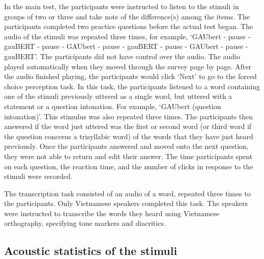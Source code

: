 \documentclass[a4paper]{article}
\begin{document}
In the main test, the participants were instructed to listen to the stimuli in groups of two or three and take note of the difference(s) among the items. The participants completed two practice questions before the actual test began. The audio of the stimuli was repeated three times, for example, `GAUbert - pause - gauBERT - pause - GAUbert - pause - gauBERT  - pause - GAUbert - pause - gauBERT'. The participants did not have control over the audio. The audio played automatically when they moved through the survey page by page. After the  audio finished playing, the participants would click `Next' to go to the forced choice perception task. In this task, the participants listened to a word containing one of the stimuli previously uttered as a single word, but uttered with a statement or a question intonation. For example, `GAUbert (question intonation)'. This stimulus was also repeated three times. The participants then answered if the word just uttered was the first or second word (or third word if the question concerns a trisyllabic word) of the words that they have just heard previously. Once the participants answered and moved onto the next question, they were not able to return and edit their answer. The time participants spent on each question, the reaction time, and the number of clicks in response to the stimuli were recorded.

The transcription task consisted of an audio of a word, repeated three times to the participants. Only Vietnamese speakers completed this task. The speakers were instructed to transcribe the words they heard using Vietnamese orthography, specifying tone markers and diacritics.

\subsection{Acoustic statistics of the stimuli}
\end{document}
